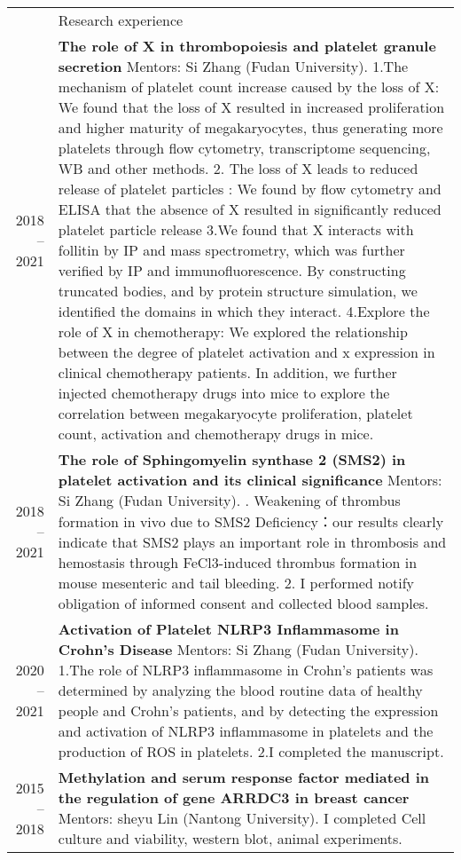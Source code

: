 \documentclass[letterpaper, 11pt]{article}
\newcommand{\headingfont}{\Large\color{OliveGreen}}
\newenvironment{SectionTable}[1]{
	\renewcommand*{\arraystretch}{1.7}
	\setlength{\tabcolsep}{10pt}
	\begin{longtable}{Rp{5.2in}} & #1 \\}
{\end{longtable}\vspace{-.3cm}}
\begin{document}
\begin{SectionTable}{\headingfont Research experience}
2018 -- 2021 &
\textbf{The role of X in thrombopoiesis and platelet granule secretion} \newline
Mentors: Si Zhang (Fudan University). \newline
1.The mechanism of platelet count increase caused by the loss of X: We found that the loss of X resulted in increased proliferation and higher maturity of megakaryocytes, thus generating more platelets through flow cytometry, transcriptome sequencing, WB and other methods.
2. The loss of X leads to reduced release of platelet particles : We found by flow cytometry and ELISA that the absence of X resulted in significantly reduced platelet particle release
3.We found that X interacts with follitin by IP and mass spectrometry, which was further verified by IP and immunofluorescence. By constructing truncated bodies, and by protein structure simulation, we identified the domains in which they interact.
4.Explore the role of X in chemotherapy: We explored the relationship between the degree of platelet activation and x expression in clinical chemotherapy patients. In addition, we further injected chemotherapy drugs into mice to explore the correlation between megakaryocyte proliferation, platelet count, activation and chemotherapy drugs in mice. \\

2018 -- 2021 &
\textbf{The role of Sphingomyelin synthase 2 (SMS2) in platelet activation and its clinical significance} \newline
Mentors:  Si Zhang (Fudan University). . Weakening of thrombus formation in vivo due to SMS2 Deficiency：our results clearly indicate that SMS2 plays an
important role in thrombosis and hemostasis through FeCl3-induced thrombus formation in mouse mesenteric and tail bleeding.
2. I performed notify obligation of informed consent and collected blood samples. \\

2020 -- 2021 &
\textbf{Activation of Platelet NLRP3 Inflammasome in Crohn’s Disease} \newline
Mentors: Si Zhang (Fudan University). \newline
1.The role of NLRP3 inflammasome in Crohn's patients was determined by analyzing the blood routine data of healthy people and Crohn's patients, and by detecting the expression and activation of NLRP3 inflammasome in platelets and the production of ROS in platelets.
2.I completed the manuscript. \\

2015 -- 2018 &
\textbf{Methylation and serum response factor mediated in the regulation of gene ARRDC3 in breast cancer} \newline
Mentors: sheyu Lin (Nantong University). \newline
I completed Cell culture and viability, western blot, animal experiments. \\
\end{SectionTable}
\end{document}
